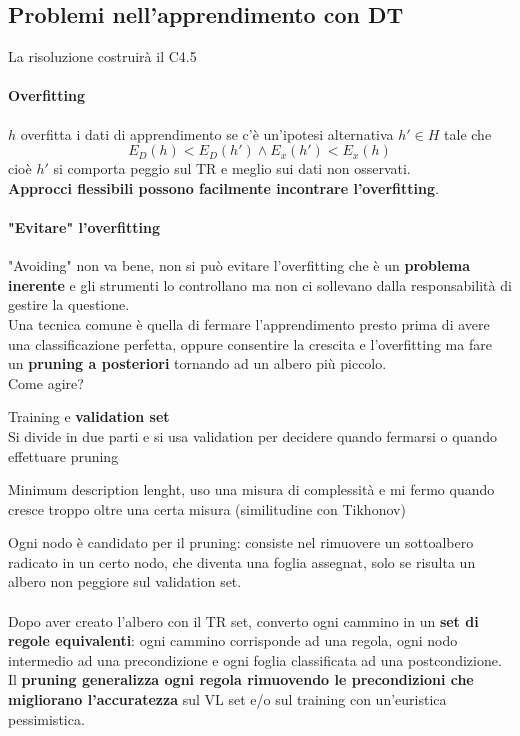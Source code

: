 \documentclass[10pt]{book}
\begin{document}
\subsection{Problemi nell'apprendimento con DT}
La risoluzione costruirà il C4.5
\paragraph{Overfitting} %
$h$ overfitta i dati di apprendimento se c'è un'ipotesi alternativa $h' \in H$ tale che $$E_D(h) < E_D(h')\wedge E_x(h') < E_x(h)$$ cioè $h'$ si comporta peggio sul TR e meglio sui dati non osservati.\\
\textbf{Approcci flessibili possono facilmente incontrare l'overfitting}.
\paragraph{"Evitare" l'overfitting} "Avoiding" non va bene, non si può evitare l'overfitting che è un \textbf{problema inerente} e gli strumenti lo controllano ma non ci sollevano dalla responsabilità di gestire la questione.\\
Una tecnica comune è quella di fermare l'apprendimento presto prima di avere una classificazione perfetta, oppure consentire la crescita e l'overfitting ma fare un \textbf{pruning a posteriori} tornando ad un albero più piccolo.\\
Come agire?
\begin{list}{}{}
	\item Training e \textbf{validation set}\\
	Si divide in due parti e si usa validation per decidere quando fermarsi o quando effettuare pruning
	\item Minimum description lenght, uso una misura di complessità e mi fermo quando cresce troppo oltre una certa misura (similitudine con Tikhonov)
\end{list}
Ogni nodo è candidato per il pruning: consiste nel rimuovere un sottoalbero radicato in un certo nodo, che diventa una foglia assegnat, solo se risulta un albero non peggiore sul validation set.\\\\
Dopo aver creato l'albero con il TR set, converto ogni cammino in un \textbf{set di regole equivalenti}: ogni cammino corrisponde ad una regola, ogni nodo intermedio ad una precondizione e ogni foglia classificata ad una postcondizione. Il \textbf{pruning generalizza ogni regola rimuovendo le precondizioni che migliorano l'accuratezza} sul VL set e/o sul training con un'euristica pessimistica.
\end{document}

